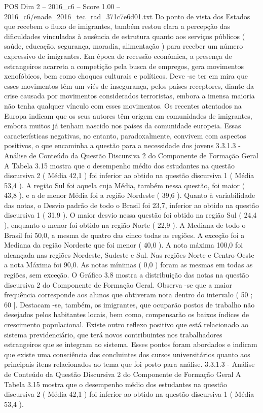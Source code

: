 \begin{textsample}{POS Dim 2 – 2016\_c6 – Score 1.00 – 2016\_c6/enade\_2016\_tec\_rad\_371c7e6d01.txt}
Do ponto de vista dos Estados que recebem o fluxo de imigrantes, também restou clara a percepção das dificuldades vinculadas à ausência de estrutura quanto aos serviços públicos ( saúde, educação, segurança, moradia, alimentação ) para receber um número expressivo de imigrantes.
Em época de recessão econômica, a presença de estrangeiros acarreta a competição pela busca de empregos, gera movimentos xenofóbicos, bem como choques culturais e políticos.
Deve -se ter em mira que esses movimentos têm um viés de insegurança, pelos países receptores, diante da crise causada por movimentos considerados terroristas, embora a imensa maioria não tenha qualquer vínculo com esses movimentos.
Os recentes atentados na Europa indicam que os seus autores têm origem em comunidades de imigrantes, embora muitos já tenham nascido nos países da comunidade europeia.
Essas características negativas, no entanto, paradoxalmente, convivem com aspectos positivos, o que encaminha a questão para a necessidade dos jovens 3.3.1.3 - Análise de Conteúdo da Questão Discursiva 2 do Componente de Formação Geral A Tabela 3.15 mostra que o desempenho médio dos estudantes na questão discursiva 2 ( Média 42,1 ) foi inferior ao obtido na questão discursiva 1 ( Média 53,4 ).
A região Sul foi aquela cuja Média, também nessa questão, foi maior ( 43,8 ), e a de menor Média foi a região Nordeste ( 39,6 ).
Quanto à variabilidade das notas, o Desvio padrão de todo o Brasil foi 23,7, inferior ao obtido na questão discursiva 1 ( 31,9 ).
O maior desvio nessa questão foi obtido na região Sul ( 24,4 ), enquanto o menor foi obtido na região Norte ( 22,9 ).
A Mediana de todo o Brasil foi 50,0, a mesma de quatro das cinco todas as regiões.
A exceção foi a Mediana da região Nordeste que foi menor ( 40,0 ).
A nota máxima 100,0 foi alcançada nas regiões Nordeste, Sudeste e Sul.
Nas regiões Norte e Centro-Oeste a nota Máxima foi 90,0.
As notas mínimas ( 0,0 ) foram as mesmas em todas as regiões, sem exceção.
O Gráfico 3.8 mostra a distribuição das notas na questão discursiva 2 do Componente de Formação Geral.
Observa -se que a maior frequência corresponde aos alunos que obtiveram nota dentro do intervalo ( 50 ; 60 ].
Destacam -se, também, os imigrantes, que ocuparão postos de trabalho não desejados pelos habitantes locais, bem como, compensarão os baixos índices de crescimento populacional.
Existe outro reflexo positivo que está relacionado ao sistema previdenciário, que terá novos contribuintes nos trabalhadores estrangeiros que se integram ao sistema.
Esses pontos foram abordados e indicam que existe uma consciência dos concluintes dos cursos universitários quanto aos principais itens relacionados ao tema que foi posto para análise. 3.3.1.3 - Análise de Conteúdo da Questão Discursiva 2 do Componente de Formação Geral A Tabela 3.15 mostra que o desempenho médio dos estudantes na questão discursiva 2 ( Média 42,1 ) foi inferior ao obtido na questão discursiva 1 ( Média 53,4 ).

\end{textsample}
